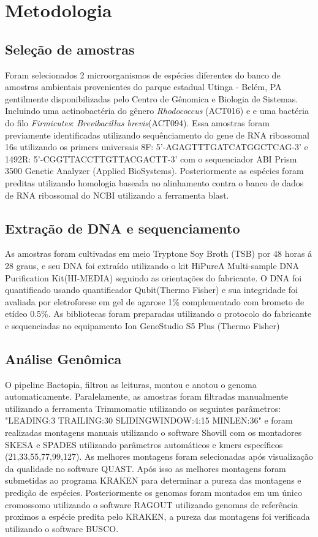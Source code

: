 \chapter{Metodologia}
\section{Seleção de amostras}
Foram selecionados 2 microorganismos de espécies diferentes do banco de amostras ambientais provenientes
do parque estadual Utinga - Belém, PA gentilmente disponibilizadas pelo Centro de Gênomica e Biologia de Sistemas.
Incluindo uma actinobactéria do gênero \textit{Rhodococcus} (ACT016) e e uma bactéria do filo \textit{Firmicutes}: \textit{Brevibacillus brevis}(ACT094).
Essa amostras foram previamente identificadas utilizando sequênciamento do gene de RNA ribossomal 16s
utilizando os primers universais 8F: 5'-AGAGTTTGATCATGGCTCAG-3' e 1492R: 5'-CGGTTACCTTGTTACGACTT-3' com o sequenciador 
ABI Prism 3500 Genetic Analyzer (Applied BioSystems). Posteriormente as espécies foram preditas utilizando
homologia baseada no alinhamento contra o banco de dados de RNA ribossomal do NCBI utilizando a ferramenta
blast.

\section{Extração de DNA e sequenciamento}
As amostras foram cultivadas em meio Tryptone Soy Broth (TSB) por 48 horas á 28 graus, e
seu DNA foi extraído utilizando o kit HiPureA Multi-sample DNA Purification Kit(HI-MEDIA) seguindo as orientações
do fabricante. O DNA foi quantificado usando quantificador Qubit(Thermo Fisher) e sua integridade foi 
avaliada por eletroforese em gel de agarose 1\% complementado com brometo de etídeo 0.5\%.
As bibliotecas foram preparadas utilizando o protocolo do fabricante e sequenciadas no equipamento
Ion GeneStudio S5 Plus (Thermo Fisher)

\section{Análise Genômica}
O pipeline Bactopia, filtrou as leituras, montou e anotou o genoma automaticamente.
Paralelamente, as amostras foram filtradas manualmente utilizando a ferramenta Trimmomatic
utilizando os seguintes parâmetros: "LEADING:3 TRAILING:30 SLIDINGWINDOW:4:15 MINLEN:36"
e foram realizadas montagens manuais utilizando o software Shovill com os montadores SKESA e SPADES utilizando
parâmetros automáticos e kmers específicos (21,33,55,77,99,127).
As melhores montagens foram selecionadas após visualização da qualidade no software QUAST. 
Após isso as melhores montagens foram submetidas ao programa KRAKEN para determinar a pureza
das montagens e predição de espécies. Posteriormente os genomas foram montados em um único cromossomo
utilizando o software RAGOUT utilizando genomas de referência proximos a espécie predita pelo KRAKEN, 
a pureza das montagens foi verificada utilizando o software BUSCO.

